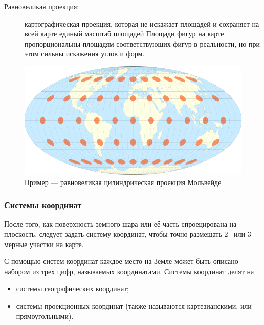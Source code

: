 \begin{frame}
    \begin{description}
        \item[Равновеликая проекция:] картографическая проекция, которая не искажает площадей и сохраняет на всей карте единый масштаб площадей
    Площади фигур на карте пропорциональны площадям соответствующих фигур в реальности, но при этом сильны искажения углов и форм.
    \end{description}
    \begin{figure}[!ht]
        \begin{center}
            \includegraphics[width=0.85\columnwidth]{./coordinates/img/mollweide.png}
        \end{center}
        \caption{Пример --- равновеликая цилиндрическая проекция Мольвейде }
    \end{figure}

\end{frame}


\begin{frame}
    \frametitle{Системы координат}
    После того, как поверхность земного шара или её часть спроецирована на плоскость, следует задать систему координат, чтобы точно размещать 2-~или 3-мерные участки на карте.

    С помощью систем координат каждое место на Земле может быть описано набором из трех цифр, называемых координатами. Системы координат делят на
    \begin{itemize}
        \item системы географических координат;
        \item системы проекционных координат (также называются картезианскими, или прямоугольными).
    \end{itemize}
\end{frame}


